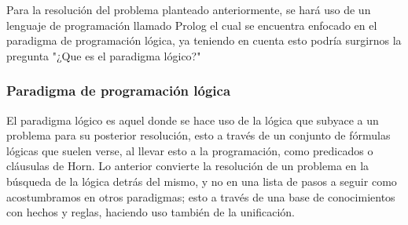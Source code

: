Para la resolución del problema planteado anteriormente, se hará uso de un lenguaje
 de programación llamado Prolog el cual se encuentra enfocado en el paradigma de programación lógica, ya teniendo en cuenta
   esto podría surgirnos la pregunta "¿Que es el paradigma lógico?" 

   \subsubsection{Paradigma de programación lógica}
    El paradigma lógico es aquel donde se hace uso de la lógica que subyace a un problema para su posterior resolución, 
    esto a través de un conjunto de fórmulas lógicas que suelen verse, al llevar esto a la programación, como predicados o cláusulas de Horn\cite{logica}. 
    Lo anterior convierte la resolución de un problema en la búsqueda de la lógica detrás del mismo, y no en una lista de pasos a seguir como 
    acostumbramos en otros paradigmas; esto a través de una base de conocimientos con hechos y reglas, haciendo uso también de la unificación.

    